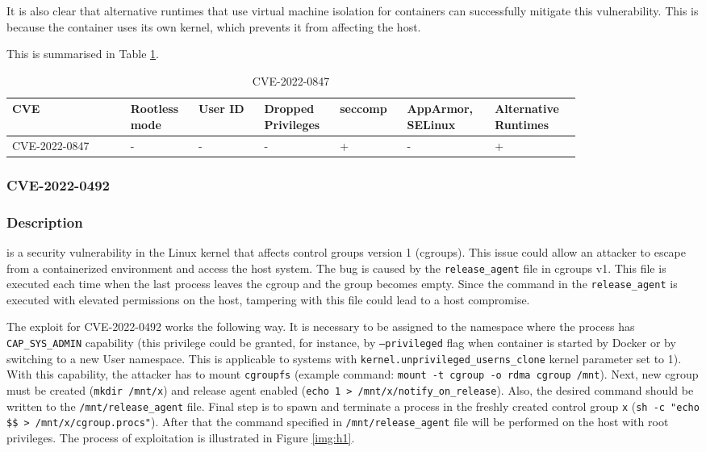 It is also clear that alternative runtimes that use virtual machine isolation for containers can successfully mitigate this vulnerability. This is because the container uses its own kernel, which prevents it from affecting the host.

This is summarised in Table \ref{tab:h:1}.

\begin{table}[H]
    \centering \small
    \begin{tabular}{| p{0.18\linewidth} | p{0.1\linewidth} | p{0.1\linewidth} | p{0.1\linewidth} | p{0.1\linewidth} | p{0.12\linewidth} | p{0.12\linewidth} |} \hline
    CVE & Rootless mode & User ID & Dropped Privileges & seccomp & AppArmor, SELinux & Alternative Runtimes \\ \hline
    CVE-2022-0847 & - & - & - & \cellcolor{green!25} + & - & \cellcolor{green!25} +  \\ \hline
    \end{tabular}
    \caption{CVE-2022-0847}
    \label{tab:h:1}
\end{table}


\subsubsection{CVE-2022-0492}

\subsubsection*{Description}

is a security vulnerability in the Linux kernel that affects control groups version 1 (cgroups). This issue could allow an attacker to escape from a containerized environment and access the host system. The bug is caused by the \texttt{release\_agent} file in cgroups v1. This file is executed each time when the last process leaves the cgroup and the group becomes empty. Since the command in the \texttt{release\_agent} is executed with elevated permissions on the host, tampering with this file could lead to a host compromise.

The exploit for CVE-2022-0492 works the following way. It is necessary to be assigned to the namespace where the process has \texttt{CAP\_SYS\_ADMIN} capability (this privilege could be granted, for instance, by \texttt{--privileged} flag when container is started by Docker or by switching to a new User namespace. This is applicable to systems with \texttt{kernel.unprivileged\_userns\_clone} kernel parameter set to 1). With this capability, the attacker has to mount \texttt{cgroupfs} (example command: \texttt{mount -t cgroup -o rdma cgroup /mnt}). Next, new cgroup must be created (\texttt{mkdir /mnt/x}) and release agent enabled (\texttt{echo 1 > /mnt/x/notify\_on\_release}). Also, the desired command should be written to the \texttt{/mnt/release\_agent} file. Final step is to spawn and terminate a process in the freshly created control group \texttt{x} (\texttt{sh -c "echo \$\$ > /mnt/x/cgroup.procs"}). After that the command specified in \texttt{/mnt/release\_agent} file will be performed on the host with root privileges. The process of exploitation is illustrated in Figure \ref{img:h1}.

